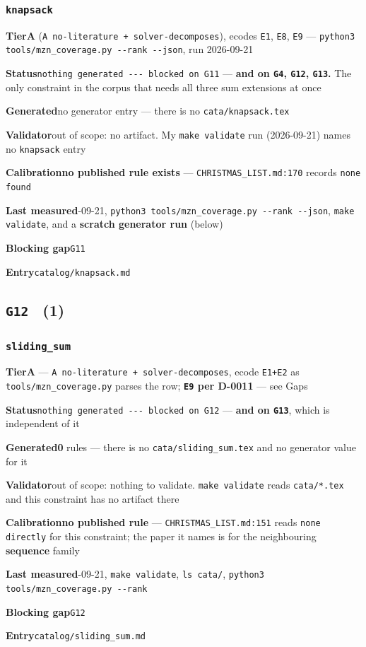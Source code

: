 \documentclass[10pt,a4paper]{article}
\newcommand{\entryfield}[2]{{\raggedright\textbf{#1}\quad #2\par}}
\begin{document}
\subsubsection*{\texttt{knapsack}}
\label{entry:knapsack}
\entryfield{Tier}{\textbf{A} (\texttt{A no-\allowbreak{}literature + solver-\allowbreak{}decomposes}), ecodes \texttt{E1}, \texttt{E8}, \texttt{E9} --- \texttt{python3 tools/\allowbreak{}mzn\_\allowbreak{}coverage.\allowbreak{}py -\allowbreak{}-\allowbreak{}rank -\allowbreak{}-\allowbreak{}json}, run 2026-09-21}
\entryfield{Status}{\texttt{nothing generated -\allowbreak{}-\allowbreak{}-\allowbreak{} blocked on G11} --- \textbf{and on \texttt{G4}, \texttt{G12}, \texttt{G13}.} The only constraint in the corpus that needs all three sum extensions at once}
\entryfield{Generated}{no generator entry --- there is no \texttt{cata/knapsack.tex}}
\entryfield{Validator}{out of scope: no artifact. My \texttt{make validate} run (2026-09-21) names no \texttt{knapsack} entry}
\entryfield{Calibration}{\textbf{no published rule exists} --- \texttt{CHRISTMAS\_LIST.md:170} records \texttt{none found}}
\entryfield{Last measured}{2026-09-21, \texttt{python3 tools/\allowbreak{}mzn\_\allowbreak{}coverage.\allowbreak{}py -\allowbreak{}-\allowbreak{}rank -\allowbreak{}-\allowbreak{}json}, \texttt{make validate}, and a \textbf{scratch generator run} (below)}
\entryfield{Blocking gap}{\texttt{G11}}
\entryfield{Entry}{\texttt{catalog/knapsack.md}}
\subsection*{\texttt{G12} \ \normalsize(1)}
\subsubsection*{\texttt{sliding\_\allowbreak{}sum}}
\label{entry:sliding-sum}
\entryfield{Tier}{\textbf{A} --- \texttt{A no-\allowbreak{}literature + solver-\allowbreak{}decomposes}, ecode \texttt{E1+E2} as \texttt{tools/mzn\_coverage.py} parses the row; \textbf{\texttt{E9} per D-0011} --- see Gaps}
\entryfield{Status}{\texttt{nothing generated -\allowbreak{}-\allowbreak{}-\allowbreak{} blocked on G12} --- \textbf{and on \texttt{G13}}, which is independent of it}
\entryfield{Generated}{\textbf{0} rules --- there is no \texttt{cata/sliding\_sum.tex} and no generator value for it}
\entryfield{Validator}{out of scope: nothing to validate. \texttt{make validate} reads \texttt{cata/*.tex} and this constraint has no artifact there}
\entryfield{Calibration}{\textbf{no published rule} --- \texttt{CHRISTMAS\_LIST.md:151} reads \texttt{none directly} for this constraint; the paper it names is for the neighbouring \textbf{sequence} family}
\entryfield{Last measured}{2026-09-21, \texttt{make validate}, \texttt{ls cata/}, \texttt{python3 tools/\allowbreak{}mzn\_\allowbreak{}coverage.\allowbreak{}py -\allowbreak{}-\allowbreak{}rank}}
\entryfield{Blocking gap}{\texttt{G12}}
\entryfield{Entry}{\texttt{catalog/sliding\_sum.md}}
\end{document}
